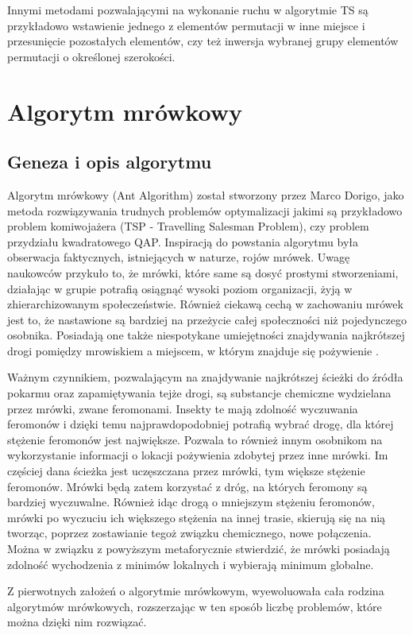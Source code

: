 Innymi metodami pozwalającymi na wykonanie ruchu w algorytmie TS są przykładowo wstawienie jednego z elementów permutacji w inne miejsce i przesunięcie pozostałych elementów, czy też inwersja wybranej grupy elementów permutacji o określonej szerokości.

\section{Algorytm mrówkowy}
\label{sec:mrowka}
\subsection{Geneza i opis algorytmu}
Algorytm mrówkowy (Ant Algorithm) został stworzony przez Marco Dorigo, jako metoda rozwiązywania trudnych problemów optymalizacji jakimi są przykładowo problem komiwojażera (TSP - Travelling Salesman Problem), czy problem przydziału kwadratowego QAP. Inspiracją do powstania algorytmu była obserwacja faktycznych, istniejących w naturze, rojów mrówek. Uwagę naukowców przykuło to, że mrówki, które same są dosyć prostymi stworzeniami, działając w grupie potrafią osiągnąć wysoki poziom organizacji, żyją w zhierarchizowanym społeczeństwie. Również ciekawą cechą w zachowaniu mrówek jest to, że nastawione są bardziej na przeżycie całej społeczności niż pojedynczego osobnika. Posiadają one także niespotykane umiejętności znajdywania najkrótszej drogi pomiędzy mrowiskiem a miejscem, w którym znajduje się pożywienie \cite{ANT_DISC}.

Ważnym czynnikiem, pozwalającym na znajdywanie najkrótszej ścieżki do źródła pokarmu oraz zapamiętywania tejże drogi, są substancje chemiczne wydzielana przez mrówki, zwane feromonami. Insekty te mają zdolność wyczuwania feromonów i dzięki temu najprawdopodobniej potrafią wybrać drogę, dla której stężenie feromonów jest największe. Pozwala to również innym osobnikom na wykorzystanie informacji o lokacji pożywienia zdobytej przez inne mrówki. Im częściej dana ścieżka jest uczęszczana przez mrówki, tym większe stężenie feromonów. Mrówki będą zatem korzystać z dróg, na których feromony są bardziej wyczuwalne. Również idąc drogą o mniejszym stężeniu feromonów, mrówki po wyczuciu ich większego stężenia na innej trasie, skierują się na nią tworząc, poprzez zostawianie tegoż związku chemicznego, nowe połączenia. Można w związku z powyższym metaforycznie stwierdzić, że mrówki posiadają zdolność wychodzenia z minimów lokalnych i wybierają minimum globalne.

Z pierwotnych założeń o algorytmie mrówkowym, wyewoluowała cała rodzina algorytmów mrówkowych, rozszerzając w ten sposób liczbę problemów, które można dzięki nim rozwiązać. 

